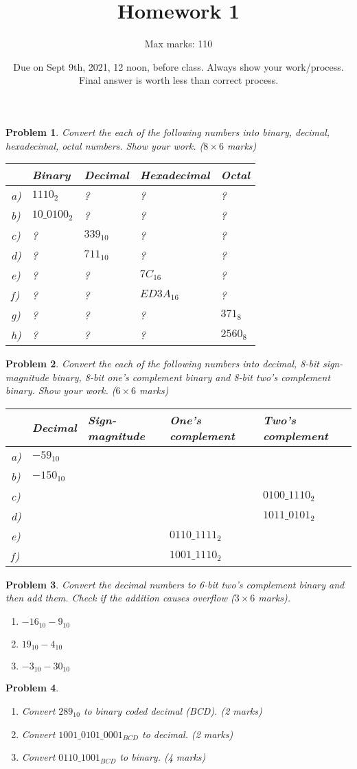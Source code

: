 \documentclass{article}
\title{Homework 1}
\author{Max marks: 110}
\date{Due on Sept 9th, 2021, 12 noon, before class. Always show your
  work/process. Final answer is worth less than correct process.}
\newtheorem{prob}{Problem}
\begin{document}
\maketitle

\begin{prob}
  Convert the each of the following numbers into binary, decimal, hexadecimal,
octal numbers. Show your work. ($8 \times 6 $ marks)

  \begin{tabular}{lllll}
    \toprule
     & Binary & Decimal & Hexadecimal & Octal \\
    \midrule
    a)& $1110_2$     & ? & ? & ?  \\
    b)& $10\_0100_2$ & ? & ? & ? \\
    c)& ? & $339_{10}$   & ? & ? \\
    d)& ? & $711_{10}$   & ? & ? \\
    e)& ? & ? & $7C_{16}$    & ? \\
    f)& ? & ? & $ED3A_{16}$  & ? \\
    g)& ? & ? & ? & $371_8$\\
    h)& ? & ? & ? & $2560_8$\\
    \bottomrule
  \end{tabular}
\end{prob}

\begin{prob}
  Convert the each of the following numbers into decimal, 8-bit sign-magnitude binary,
  8-bit one's complement binary and 8-bit two's complement binary. Show your work. ($6 \times 6 $ marks)

  \begin{tabular}{lllll}
    \toprule
    & Decimal & Sign-magnitude & One's complement & Two's complement \\
    \midrule
    a) & $-59_{10}$ & & & \\
    b) & $-150_{10}$ & & & \\
    c) & & & & $0100\_1110_2$ \\
    d) & &  & & $1011\_0101_2$\\
    e) & & & $0110\_1111_2$&  \\
    f) & &  & $1001\_1110_2$& \\
    \bottomrule
  \end{tabular}
\end{prob}

\begin{prob}
  Convert the decimal numbers to 6-bit two's complement binary and then add
  them. Check if the addition causes overflow ($3 \times 6$ marks).
  \begin{enumerate}
  \item $-16_{10} - 9_{10}$
  \item $19_{10} - 4_{10}$
  \item $-3_{10} - 30_{10}$
  \end{enumerate}
\end{prob}

\begin{prob}
  \begin{enumerate}
  \item Convert $289_{10}$  to binary coded decimal (BCD). (2 marks)
  \item Convert $1001\_ 0101\_ 0001_{BCD}$  to decimal. (2 marks)
  \item Convert $0110\_ 1001_{BCD}$  to binary. (4 marks)
  \end{enumerate}
\end{prob}
\end{document}
